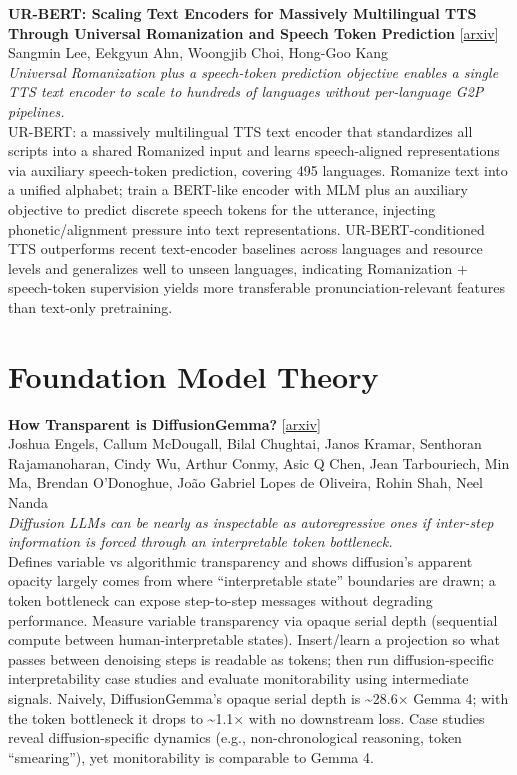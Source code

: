 \documentclass[12pt,letterpaper]{article}
\begin{document}
\medskip

{\small\textbf{UR-BERT: Scaling Text Encoders for Massively Multilingual TTS Through Universal Romanization and Speech Token Prediction}} {\scriptsize[\href{https://arxiv.org/abs/2606.11681}{arxiv}]}\\
{\scriptsize Sangmin Lee, Eekgyun Ahn, Woongjib Choi, Hong-Goo Kang}\\

{\small\textit{Universal Romanization plus a speech-token prediction objective enables a single TTS text encoder to scale to hundreds of languages without per-language G2P pipelines.}}\\[1pt]
{\footnotesize UR-BERT: a massively multilingual TTS text encoder that standardizes all scripts into a shared Romanized input and learns speech-aligned representations via auxiliary speech-token prediction, covering 495 languages. Romanize text into a unified alphabet; train a BERT-like encoder with MLM plus an auxiliary objective to predict discrete speech tokens for the utterance, injecting phonetic/alignment pressure into text representations. UR-BERT-conditioned TTS outperforms recent text-encoder baselines across languages and resource levels and generalizes well to unseen languages, indicating Romanization + speech-token supervision yields more transferable pronunciation-relevant features than text-only pretraining.}

\medskip


\section*{Foundation Model Theory}

{\small\textbf{How Transparent is DiffusionGemma?}} {\scriptsize[\href{https://arxiv.org/abs/2606.20560}{arxiv}]}\\
{\scriptsize Joshua Engels, Callum McDougall, Bilal Chughtai, Janos Kramar, Senthoran Rajamanoharan, Cindy Wu, Arthur Conmy, Asic Q Chen, Jean Tarbouriech, Min Ma, Brendan O'Donoghue, João Gabriel Lopes de Oliveira, Rohin Shah, Neel Nanda}\\

{\small\textit{Diffusion LLMs can be nearly as inspectable as autoregressive ones if inter-step information is forced through an interpretable token bottleneck.}}\\[1pt]
{\footnotesize Defines variable vs algorithmic transparency and shows diffusion's apparent opacity largely comes from where ``interpretable state'' boundaries are drawn; a token bottleneck can expose step-to-step messages without degrading performance. Measure variable transparency via opaque serial depth (sequential compute between human-interpretable states). Insert/learn a projection so what passes between denoising steps is readable as tokens; then run diffusion-specific interpretability case studies and evaluate monitorability using intermediate signals. Naively, DiffusionGemma's opaque serial depth is \textasciitilde{}28.6× Gemma 4; with the token bottleneck it drops to \textasciitilde{}1.1× with no downstream loss. Case studies reveal diffusion-specific dynamics (e.g., non-chronological reasoning, token ``smearing''), yet monitorability is comparable to Gemma 4.}
\end{document}

